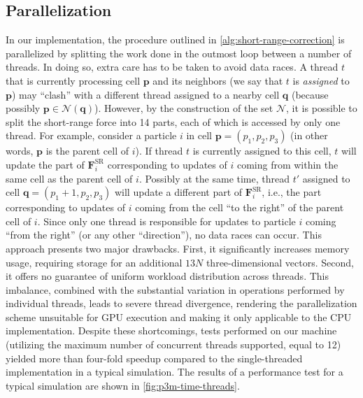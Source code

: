 \subsection{Parallelization}
In our implementation, the procedure outlined in \autoref{alg:short-range-correction} is parallelized by splitting the work done in the outmost loop between a number of threads.
In doing so, extra care has to be taken to avoid data races.
A thread $t$ that is currently processing cell $\mathbf{p}$ and its neighbors (we say that $t$ is \textit{assigned} to $\mathbf{p}$) may ``clash'' with a different thread assigned to a nearby cell $\mathbf{q}$ (because possibly $\mathbf{p} \in \mathcal{N}(\mathbf{q})$).
However, by the construction of the set $\mathcal{N}$, it is possible to split the short-range force into 14 parts, each of which is accessed by only one thread.
For example, consider a particle $i$ in cell $\mathbf{p} = (p_1, p_2, p_3)$ (in other words, $\mathbf{p}$ is the parent cell of $i$).
If thread $t$ is currently assigned to this cell, $t$ will update the part of $\mathbf{F}^\text{SR}_i$ corresponding to updates of $i$ coming from within the same cell as the parent cell of $i$.
Possibly at the same time, thread $t'$ assigned to cell $\mathbf{q} = (p_1+1, p_2, p_3)$ will update a different part of $\mathbf{F}^\text{SR}_i$, i.e., the part corresponding to updates of $i$ coming from the cell ``to the right'' of the parent cell of $i$.
Since only one thread is responsible for updates to particle $i$ coming ``from the right'' (or any other ``direction''), no data races can occur.
This approach presents two major drawbacks.
First, it significantly increases memory usage, requiring storage for an additional $13N$ three-dimensional vectors.
Second, it offers no guarantee of uniform workload distribution across threads.
This imbalance, combined with the substantial variation in operations performed by individual threads, leads to severe thread divergence, rendering the parallelization scheme unsuitable for GPU execution and making it only applicable to the CPU implementation.
Despite these shortcomings, tests performed on our machine (utilizing the maximum number of concurrent threads supported, equal to 12) yielded more than four-fold speedup compared to the single-threaded implementation in a typical simulation.
The results of a performance test for a typical simulation are shown in \autoref{fig:p3m-time-threads}.
